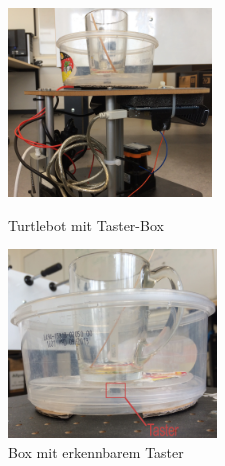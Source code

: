\documentclass[a4paper,12pt,headsepline]{scrartcl}
\begin{document}
\begin{figure}[h]
\begin{minipage}[t]{0.45\linewidth}
\centering
\includegraphics[height=5cm]{Images/Taster01.png}
\caption{Turtlebot mit Taster-Box}
\label{fig:taster01}
\end{minipage}
\hfill
\begin{minipage}[t]{0.45\linewidth}
\centering
\includegraphics[height=5cm]{Images/Taster02.png}
\caption{Box mit erkennbarem Taster}
\label{fig:taster02}
\end{minipage}
\end{figure}
\end{document}
